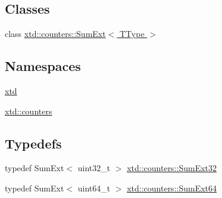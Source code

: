 \subsection*{Classes}
\begin{DoxyCompactItemize}
\item 
class \hyperlink{classxtd_1_1counters_1_1SumExt}{xtd\+::counters\+::\+Sum\+Ext$<$ T\+Type $>$}
\end{DoxyCompactItemize}
\subsection*{Namespaces}
\begin{DoxyCompactItemize}
\item 
 \hyperlink{namespacextd}{xtd}
\item 
 \hyperlink{namespacextd_1_1counters}{xtd\+::counters}
\end{DoxyCompactItemize}
\subsection*{Typedefs}
\begin{DoxyCompactItemize}
\item 
typedef Sum\+Ext$<$ uint32\+\_\+t $>$ \hyperlink{namespacextd_1_1counters_a7e0abdd1fae0f70421c2e0ea3924db6f}{xtd\+::counters\+::\+Sum\+Ext32}
\item 
typedef Sum\+Ext$<$ uint64\+\_\+t $>$ \hyperlink{namespacextd_1_1counters_a268d063d4f32d16f65c388b8791602e3}{xtd\+::counters\+::\+Sum\+Ext64}
\end{DoxyCompactItemize}
